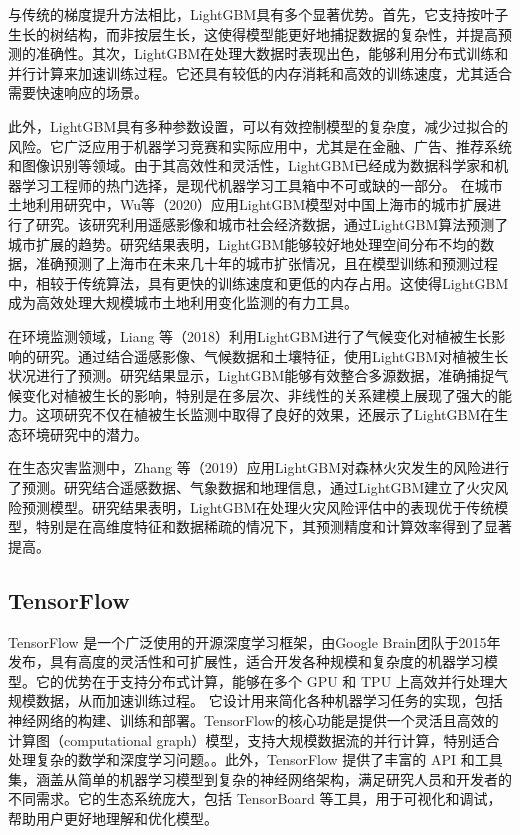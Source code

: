 \documentclass[AutoFakeBold]{LZUThesis-PgD&PhD}
\begin{document}
	与传统的梯度提升方法相比，LightGBM具有多个显著优势。首先，它支持按叶子生长的树结构，而非按层生长，这使得模型能更好地捕捉数据的复杂性，并提高预测的准确性。其次，LightGBM在处理大数据时表现出色，能够利用分布式训练和并行计算来加速训练过程。它还具有较低的内存消耗和高效的训练速度，尤其适合需要快速响应的场景。
	
	此外，LightGBM具有多种参数设置，可以有效控制模型的复杂度，减少过拟合的风险。它广泛应用于机器学习竞赛和实际应用中，尤其是在金融、广告、推荐系统和图像识别等领域。由于其高效性和灵活性，LightGBM已经成为数据科学家和机器学习工程师的热门选择，是现代机器学习工具箱中不可或缺的一部分。
	在城市土地利用研究中，Wu等（2020）应用LightGBM模型对中国上海市的城市扩展进行了研究\cite{wu2020}。该研究利用遥感影像和城市社会经济数据，通过LightGBM算法预测了城市扩展的趋势。研究结果表明，LightGBM能够较好地处理空间分布不均的数据，准确预测了上海市在未来几十年的城市扩张情况，且在模型训练和预测过程中，相较于传统算法，具有更快的训练速度和更低的内存占用。这使得LightGBM成为高效处理大规模城市土地利用变化监测的有力工具。
	
	在环境监测领域，Liang 等（2018）利用LightGBM进行了气候变化对植被生长影响的研究\cite{liang2018}。通过结合遥感影像、气候数据和土壤特征，使用LightGBM对植被生长状况进行了预测。研究结果显示，LightGBM能够有效整合多源数据，准确捕捉气候变化对植被生长的影响，特别是在多层次、非线性的关系建模上展现了强大的能力。这项研究不仅在植被生长监测中取得了良好的效果，还展示了LightGBM在生态环境研究中的潜力。
	
	在生态灾害监测中，Zhang 等（2019）应用LightGBM对森林火灾发生的风险进行了预测\cite{zhang2019}。研究结合遥感数据、气象数据和地理信息，通过LightGBM建立了火灾风险预测模型。研究结果表明，LightGBM在处理火灾风险评估中的表现优于传统模型，特别是在高维度特征和数据稀疏的情况下，其预测精度和计算效率得到了显著提高。
	
	\subsection{TensorFlow}
	
	TensorFlow 是一个广泛使用的开源深度学习框架，由Google Brain团队于2015年发布，具有高度的灵活性和可扩展性，适合开发各种规模和复杂度的机器学习模型。它的优势在于支持分布式计算，能够在多个 GPU 和 TPU 上高效并行处理大规模数据，从而加速训练过程。
	它设计用来简化各种机器学习任务的实现，包括神经网络的构建、训练和部署。TensorFlow的核心功能是提供一个灵活且高效的计算图（computational graph）模型，支持大规模数据流的并行计算，特别适合处理复杂的数学和深度学习问题。。此外，TensorFlow 提供了丰富的 API 和工具集，涵盖从简单的机器学习模型到复杂的神经网络架构，满足研究人员和开发者的不同需求。它的生态系统庞大，包括 TensorBoard 等工具，用于可视化和调试，帮助用户更好地理解和优化模型。
	
\end{document}
